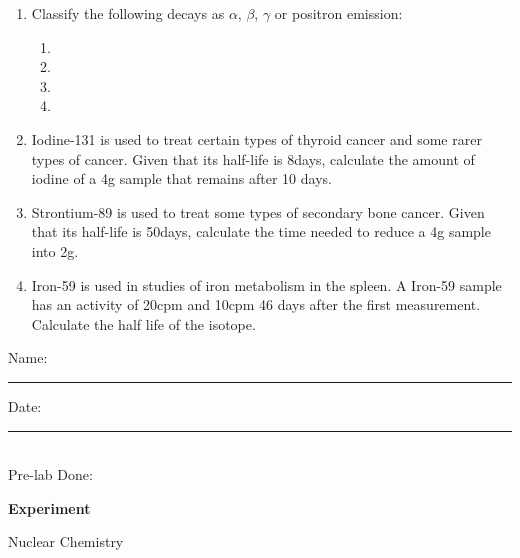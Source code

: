 \documentclass[main.tex]{subfiles}
\begin{document}
\begin{enumerate}
\item Classify the following decays as $\alpha$, $\beta$, $\gamma$ or positron emission:
\begin{enumerate}[label=(\alph*)]
\item \centerline{ }
\item \centerline{ }
\item \centerline{ }
\item \centerline{ }

\end{enumerate}

\item Iodine-131 is used to treat certain types of thyroid cancer and some rarer types of cancer. Given that its half-life is 8days, calculate the amount of iodine of a 4g sample that remains after 10 days.
\vspace{3cm}
\item Strontium-89  is used to treat some types of secondary bone cancer. Given that its half-life is 50days, calculate the time needed to reduce a 4g sample into 2g.
\vspace{3cm}
\item Iron-59 is used in studies of iron metabolism in the spleen. A Iron-59 sample has an activity of 20cpm and 10cpm 46 days after the first measurement. Calculate the half life of the isotope.
\vspace{3cm}





\end{enumerate}


\clearpage\mbox{}\clearpage



\begin{multicols}{2}
\begin{tcolorbox}[enhanced jigsaw,breakable,size=title,
colback=mybrown!05,colframe=black,fonttitle=\bfseries,
title=STUDENT INFO,pad at break=1mm, break at=15cm/0pt ]
\vspace{0.2cm}
\noindent Name: \rule{5cm}{0.4pt}Date:\rule{1cm}{0.4pt}\\
Pre-lab Done: \quad
\end{tcolorbox}
\end{multicols}
\hfill
\vspace{0.2cm}
\begin{center}
{\large \bfseries 
Experiment
\par
\Huge
Nuclear Chemistry
\\[5pt] \par}
\vspace{0.2cm}
\end{center}
\par
\noindent
\uline{  \hfill \normalsize \hfill       }
\end{document}
